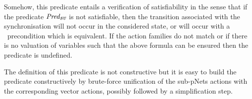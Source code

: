 \documentclass{lmcs}
\newcommand{\TODO}[1]{\textcolor{red}{\textbf{[TODO:#1]}}}
\begin{document}
Somehow, this predicate entails a verification of satisfiability in the sense that if the 
predicate $\Predsv$ is not satisfiable, then the transition associated with the 
synchronisation will not occur in the considered state, or will occur with a \False\ precondition which is equivalent.
If the action families do not match or if there is no valuation of
variables such that the above formula can be ensured then the predicate is undefined.

The definition of this predicate is not constructive but it is easy to build the predicate constructively by brute-force unification of the sub-pNets actions with the corresponding vector actions, possibly followed by a simplification step.



\end{document}
